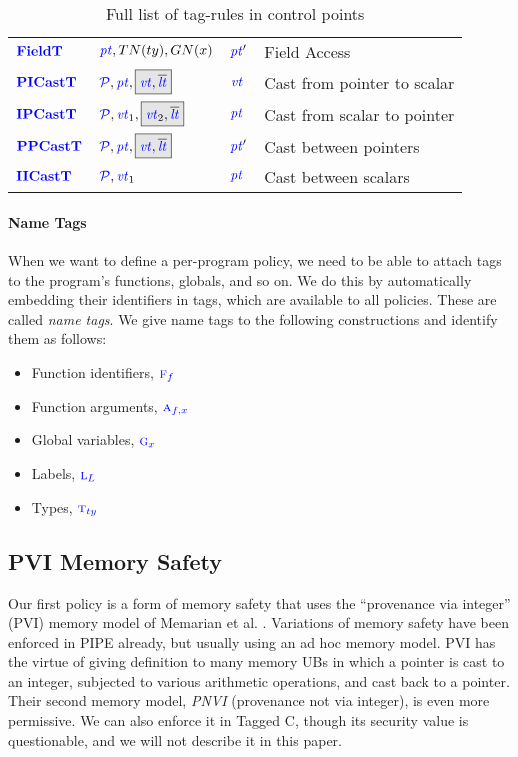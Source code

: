 \documentclass{llncs}
\begin{document}
\begin{table}[t]
\begin{tabular}{|l|l|l|l|}
    \(\color{blue} \mathbf{FieldT}\)     & \(\mathit{\color{blue} pt}, TN(ty), GN(x)\)        & \(\mathit{\color{blue} pt}'\)     & Field Access \\
    \(\color{blue} \mathbf{PICastT}\)    & \(\picasttargs\)       & \(\mathit{\color{blue} vt}\)    & Cast from pointer to scalar \\
    \(\color{blue} \mathbf{IPCastT}\)    & \(\ipcasttargs\)       & \(\mathit{\color{blue} pt}\)    & Cast from scalar to pointer \\
    \(\color{blue} \mathbf{PPCastT}\)    & \(\ppcasttargs\)       & \(\mathit{\color{blue} pt}'\)    & Cast between pointers \\
    \(\color{blue} \mathbf{IICastT}\)    & \(\mathcal{\color{blue} P}, \mathit{\color{blue} vt}_1\)       & \(\mathit{\color{blue} pt}\)    & Cast between scalars \\
    \hline
  \end{tabular}

  \caption{Full list of tag-rules in control points}
  \label{fig:controlpoints}
\end{table}

\paragraph*{Name Tags}

When we want to define a per-program policy, we need to be able to attach tags to the program's
functions, globals, and so on. We do this by automatically embedding their identifiers in tags,
which are available to all policies. These are called {\em name tags}. We give name tags to the
following constructions and identify them as follows:
\begin{itemize}
\item Function identifiers, \({\color{blue} \textnormal{\sc f}_{f}}\)
\item Function arguments, \({\color{blue} \textnormal{\sc a}_{f,x}}\)
\item Global variables, \({\color{blue} \textnormal{\sc g}_{x}}\)
\item Labels, \({\color{blue} \textnormal{\sc l}_{L}}\)
\item Types, \({\color{blue} \textnormal{\sc t}_{ty}}\)
\end{itemize}

\subsection{PVI Memory Safety}
\label{sec:PVI}

Our first policy is a form of memory safety that uses the ``provenance via integer'' (PVI) memory model
of Memarian et al. \cite{Memarian19:ExploringCSemantics}.
Variations of memory safety have been enforced in PIPE already, but usually using
an ad hoc memory model. PVI has the virtue of giving definition to many memory UBs in which a pointer is
cast to an integer, subjected to various arithmetic operations, and cast back to a pointer.
Their second memory model, {\it PNVI} (provenance not via integer), is even more permissive.
We can also enforce it in Tagged C, though its security value is questionable, and we will
not describe it in this paper.
\end{document}

